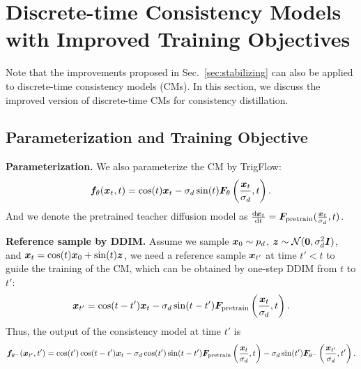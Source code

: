 \section{Discrete-time Consistency Models with Improved Training Objectives}
\label{appendix:discrete-trigflow}

Note that the improvements proposed in Sec.~\ref{sec:stabilizing} can also be applied to discrete-time consistency models (CMs). In this section, we discuss the improved version of discrete-time CMs for consistency distillation.

\subsection{Parameterization and Training Objective}

\textbf{Parameterization. }
We also parameterize the CM by TrigFlow:
\[
{\bm{f}}_\theta({\bm{x}}_t,t) = \cos(t){\bm{x}}_t - \sigma_d \sin(t) {\bm{F}}_\theta\left(\frac{{\bm{x}}_t}{\sigma_d}, t\right).
\]
And we denote the pretrained teacher diffusion model as $\frac{\mathrm{d} {\bm{x}}_t}{\mathrm{d} t} = {\bm{F}}_{\text{pretrain}}(\frac{{\bm{x}}_t}{\sigma_d}, t)$.

\textbf{Reference sample by DDIM. }
Assume we sample ${\bm{x}}_0\sim p_d$, ${\bm{z}} \sim {\mathcal{N}}({\bm{0}}, \sigma_d^2{\bm{I}})$, and ${\bm{x}}_t = \cos(t){\bm{x}}_0 + \sin(t){\bm{z}}$, we need a reference sample ${\bm{x}}_{t'}$ at time $t' < t$ to guide the training of the CM, which can be obtained by one-step DDIM from $t$ to $t'$:
\[
{\bm{x}}_{t'} = \cos(t-t'){\bm{x}}_t - \sigma_d\sin(t-t'){\bm{F}}_{\text{pretrain}} \left( \frac{{\bm{x}}_t}{\sigma_d}, t \right).
\]
Thus, the output of the consistency model at time $t'$ is
\begin{equation}
\label{eq:appendix:f_t_reference}
{\bm{f}}_{\theta^-}({\bm{x}}_{t'},t')=\cos(t')\cos(t-t'){\bm{x}}_t-\sigma_d\cos(t')\sin(t-t'){\bm{F}}_{\text{pretrain}}\left(\frac{{\bm{x}}_t}{\sigma_d},t\right)-\sigma_d\sin(t'){\bm{F}}_{\theta^-}\left(\frac{{\bm{x}}_{t'}}{\sigma_d},t'\right).
\end{equation}


